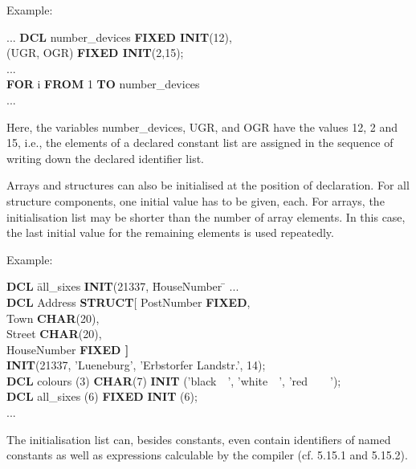 Example:

...
{\bf DCL} number\_devices {\bf FIXED INIT}(12),\\
\x (UGR, OGR) {\bf FIXED INIT}(2,15);\\
...\\
{\bf FOR} i {\bf FROM} 1 {\bf TO} number\_devices\\
...

Here, the variables number\_devices, UGR, and OGR have the values 12, 2
and 15, i.e., the elements of a declared constant list are assigned in
the sequence of writing down the declared identifier list.

Arrays and structures can also be initialised at the position of
declaration. For all structure components, one initial value has to be
given, each. For arrays, the initialisation list may be shorter than the
number of array elements. In this case, the last initial value for the
remaining elements is used repeatedly.

Example:

\begin{tabbing}
{\bf DCL} \= all\_sixes \= {\bf INIT}(21337, \= HouseNumber \= \kill
... \> \> \> \> \\
{\bf DCL} \> Address \> {\bf STRUCT}[ \> PostNumber  \> {\bf FIXED},\\
          \>         \>               \> Town        \> {\bf CHAR}(20),\\
          \>         \>               \> Street      \> {\bf CHAR}(20),\\
          \>         \>               \> HouseNumber \> {\bf FIXED \hspace{1cm} ]}\\
          \>         \> {\bf INIT}(21337, 'Lueneburg', 'Erbstorfer Landstr.', 14); \> \> \\
{\bf DCL} \> colours \> (3)           \> {\bf CHAR}(7) \> {\bf INIT} ('black\ \ ', 'white\ \ ', 'red\ \ \ \ ');\\
{\bf DCL} \> all\_sixes \> (6)        \> {\bf FIXED}  \> {\bf INIT} (6);\\
... \> \> \> \>
\end{tabbing}

The initialisation list can, besides constants, even contain identifiers
of named constants as well as expressions calculable by the compiler
(cf. 5.15.1 and 5.15.2).

